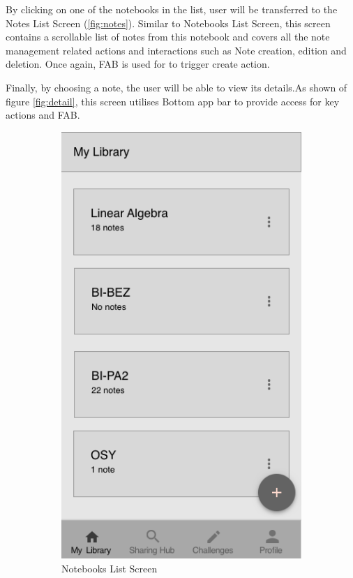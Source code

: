 \documentclass[thesis=B,english]{FITthesis}[2012/10/20]
\begin{document}
	By clicking on one of the notebooks in the list, user will be transferred to the Notes List Screen (\ref{fig:notes}). Similar to Notebooks List Screen, this screen contains a scrollable list of notes from this notebook and  covers all the note management related actions and interactions such as Note creation, edition and deletion. Once again, FAB is used for to trigger create action.
	
	Finally, by choosing a note, the user will be able to view its details.As shown of figure \ref{fig:detail}, this screen utilises Bottom app bar to provide access for key actions and FAB.
	
\begin{figure}
\centering
\begin{subfigure}{.5\textwidth}
  \centering
  \includegraphics[scale=0.4]{Notebooks.png}
  \caption{Notebooks List Screen}
  \label{fig:notebooks}
\end{subfigure}%
\begin{subfigure}{.5\textwidth}
  \centering

\end{subfigure}
\end{figure}
\end{document}
